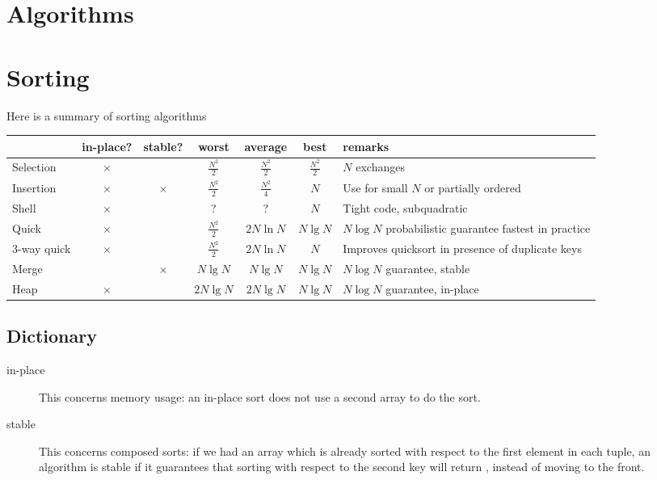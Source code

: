 \section{Algorithms}

\section{Sorting}
Here is a summary of sorting algorithms


\begin{tabular}{|p{15mm}||c c c c c p{2.5cm}|}
\hline
& in-place? & stable? & worst & average & best & remarks\\
\hline \hline
Selection & $\times$ & & $\frac{N^2}{2}$ & $\frac{N^2}{2}$ & $\frac{N^2}{2}$ & $N$ exchanges \\
Insertion & $\times$ & $\times$ & $\frac{N^2}{2}$ & $\frac{N^2}{4}$ & $N$ & Use for small $N$ or partially ordered \\
Shell & $\times$ &  & ? & ? & $N$ & Tight code, subquadratic \\
Quick & $\times$ & & $\frac{N^2}{2}$ & $2N \ln N$ & $N \lg N$ & $N \log N$ probabilistic guarantee fastest in practice \\
3-way quick & $\times$ & & $\frac{N^2}{2}$ & $2N \ln N$ & $N$ & Improves quicksort in presence of duplicate keys \\
Merge& & $\times$ & $N \lg N$ & $N \lg N$ & $N \lg N$ & $N \log N$ guarantee, stable \\
Heap& $\times$ & & $2 N \lg N$ & $2 N \lg N$ & $N \lg N$ & $N \log N$ guarantee, in-place \\
\hline
\end{tabular}

\subsection{Dictionary}

\begin{description}
\item[in-place] This concerns memory usage: an in-place sort does not use a 
second array to do the sort.

\item[stable] This concerns composed sorts: if we had an array 
\code{[(a, 1), (a, 2), (b, 1)]} which is already sorted with 
respect to the first element in each tuple, an algorithm is stable
if it guarantees that sorting with respect to the second key will
return \code{[(a, 1), (b, 1), (a, 2)]}, instead of moving 
to the front.
\end{description}

